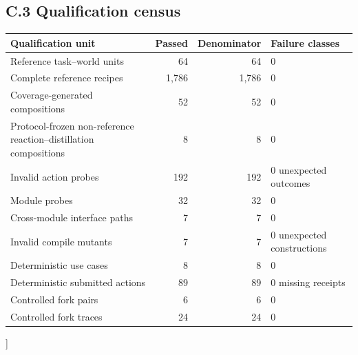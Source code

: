 \documentclass[10pt,twocolumn]{article}
\begin{document}
\begin{@twocolumnfalse}
\subsection{C.3 Qualification census}\label{appendix-c.3-qualification-census}
\centering
\small
{}
\label{tab:qualification-census}
\begin{tabularx}{\textwidth}{@{}YrrY@{}}
\toprule
Qualification unit & Passed & Denominator & Failure classes \\
\midrule
Reference task--world units & 64 & 64 & 0 \\
Complete reference recipes & 1,786 & 1,786 & 0 \\
Coverage-generated compositions & 52 & 52 & 0 \\
Protocol-frozen non-reference reaction--distillation compositions & 8 & 8 & 0 \\
Invalid action probes & 192 & 192 & 0 unexpected outcomes \\
Module probes & 32 & 32 & 0 \\
Cross-module interface paths & 7 & 7 & 0 \\
Invalid compile mutants & 7 & 7 & 0 unexpected constructions \\
Deterministic use cases & 8 & 8 & 0 \\
Deterministic submitted actions & 89 & 89 & 0 missing receipts \\
Controlled fork pairs & 6 & 6 & 0 \\
Controlled fork traces & 24 & 24 & 0 \\
\bottomrule
\end{tabularx}
\end{@twocolumnfalse}
]
\end{document}
